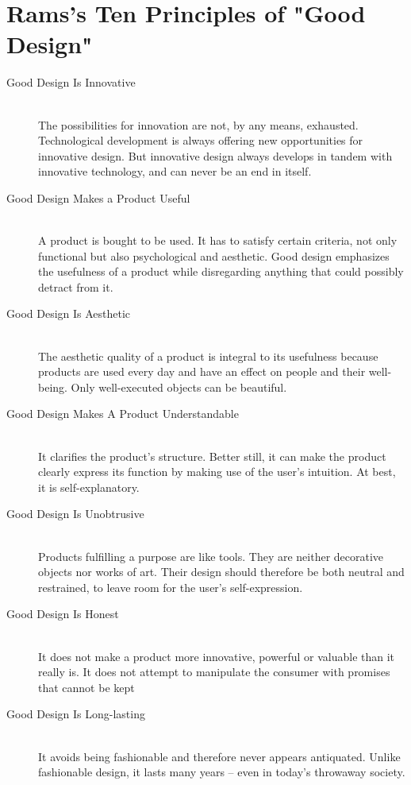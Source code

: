 \documentclass[letterpaper]{article}
\begin{document}
\section*{Rams's Ten Principles of "Good Design"}
\begin{description}

\item[Good Design Is Innovative] \hfill \\
The possibilities for innovation are not, by any means, exhausted. Technological development is always offering new opportunities for innovative design. But innovative design always develops in tandem with innovative technology, and can never be an end in itself.

\item[Good Design Makes a Product Useful] \hfill \\
A product is bought to be used. It has to satisfy certain criteria, not only functional but also psychological and aesthetic. Good design emphasizes the usefulness of a product while disregarding anything that could possibly detract from it.

\item[Good Design Is Aesthetic] \hfill \\
The aesthetic quality of a product is integral to its usefulness because products are used every day and have an effect on people and their well-being. Only well-executed objects can be beautiful.

\item[Good Design Makes A Product Understandable] \hfill \\
It clarifies the product's structure. Better still, it can make the product clearly express its function by making use of the user's intuition. At best, it is self-explanatory.

\item[Good Design Is Unobtrusive] \hfill \\
Products fulfilling a purpose are like tools. They are neither decorative objects nor works of art. Their design should therefore be both neutral and restrained, to leave room for the user's self-expression.

\item[Good Design Is Honest] \hfill \\
It does not make a product more innovative, powerful or valuable than it really is. It does not attempt to manipulate the consumer with promises that cannot be kept

\item[Good Design Is Long-lasting] \hfill \\
It avoids being fashionable and therefore never appears antiquated. Unlike fashionable design, it lasts many years -- even in today's throwaway society.


\end{description}
\end{document}
